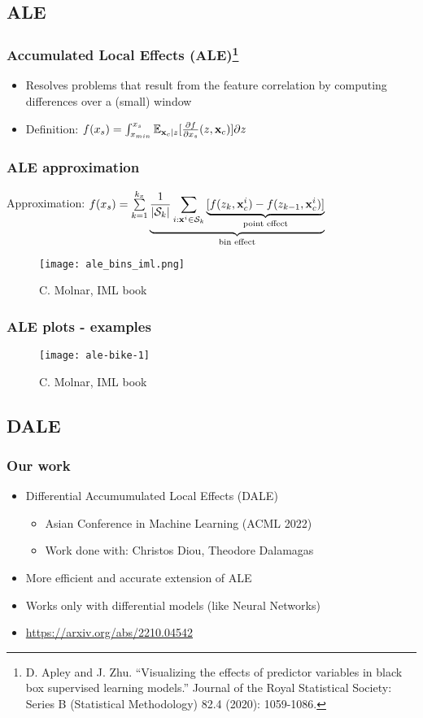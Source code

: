 \subsection{ALE}
\begin{frame}
 \frametitle{Accumulated Local Effects (ALE)\footnote{D. Apley and
   J. Zhu. ``Visualizing the effects of predictor variables in black box
   supervised learning models.'' Journal of the Royal Statistical Society:
   Series B (Statistical Methodology) 82.4 (2020): 1059-1086.}}

 \begin{itemize}
 \item Resolves problems that result from the feature correlation by computing
   differences over a (small) window
 \item Definition: \(f(x_s) = \int_{x_{min}}^{x_s}\mathbb{E}_{\mathbf{x}_c|z}[ \frac{\partial f}{\partial x_s}(z, \mathbf{x}_c)] \partial z\)
 \end{itemize}
\end{frame}

\begin{frame}
 \frametitle{ALE approximation}
 Approximation: \(f(x_s) = \sum\limits_{k=1}^{k_x}
 \underbrace{\frac{1}{|\mathcal{S}_k|} \sum_{i:\mathbf{x}^i \in \mathcal{S}_k}
   \underbrace{[f(z_k, \mathbf{x}^i_c) - f(z_{k-1}, \mathbf{x}^i_c)]}_{\text{point
       effect}}}_{\text{bin effect}} \)

 \begin{figure}[ht]
   \centering
   \texttt{[image: ale\_bins\_iml.png]}
   \caption{\footnotesize C. Molnar, IML book}
 \end{figure}
\end{frame}

\begin{frame}
 \frametitle{ALE plots - examples}
 \begin{figure}
   \texttt{[image: ale-bike-1]}
   \caption{\footnotesize C. Molnar, IML book}
 \end{figure}
\end{frame}

\subsection{DALE}
\begin{frame}
  \frametitle{Our work}

  \begin{itemize}
  \item Differential Accumumulated Local Effects (DALE)
    \begin{itemize}
    \item Asian Conference in Machine Learning (ACML 2022)
    \item Work done with: Christos Diou, Theodore Dalamagas
    \end{itemize}
  \item More efficient and accurate extension of ALE
  \item Works only with differential models (like Neural Networks)
  \item \href{https://arxiv.org/abs/2210.04542}{https://arxiv.org/abs/2210.04542}
  \end{itemize}
\end{frame}


